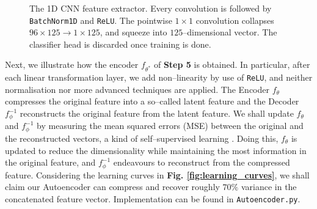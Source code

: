 \begin{figure}[H]
\caption{The 1D CNN feature extractor. Every convolution is followed by \texttt{BatchNorm1D} and \texttt{ReLU}. The pointwise $1\times1$ convolution collapses $96 \times 125 \to 1 \times 125$, and squeeze into $125$–dimensional vector. The classifier head is discarded once training is done.}
\label{fig:cnn_extractor}
\end{figure}

Next, we illustrate how the encoder $f_{\theta^\ast}$ of \textbf{Step 5} is obtained.
In particular, after each linear transformation layer, we add non–linearity by use of \texttt{ReLU}, and neither normalisation nor more advanced techniques are applied.
The Encoder $f_\theta$ compresses the original feature into a so–called latent feature and the Decoder $f^{-1}_\phi$ reconstructs the original feature from the latent feature.
We shall update $f_\theta$ and $f^{-1}_\phi$ by measuring the mean squared errors (MSE) between the original and the reconstructed vectors, a kind of self–supervised learning \cite{10.1145/3746280}. Doing this, $f_\theta$ is updated to reduce the dimensionality while maintaining the most information in the original feature, and $f^{-1}_\phi$ endeavours to reconstruct from the compressed feature.
Considering the learning curves in \textbf{Fig. \ref{fig:learning_curves}}, we shall claim our Autoencoder can compress and recover roughly $70\%$ variance in the concatenated feature vector.
Implementation can be found in \texttt{Autoencoder.py}.

